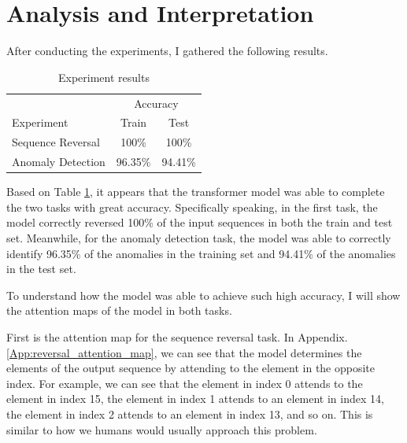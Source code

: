 \documentclass[peerreview]{IEEEtran}
\begin{document}
\section{Analysis and Interpretation}
After conducting the experiments, I gathered the following results. 


\begin{table}[h] 
\centering 
\begin{tabular}{l c c}
\toprule 
& \multicolumn{2}{c}{Accuracy} \\ 
\cmidrule(l){2-3} 
Experiment & Train & Test\\ 
\midrule
Sequence Reversal & 100\% & 100\%\\
Anomaly Detection & 96.35\% & 94.41\%\\ 
\bottomrule
\end{tabular}
\smallskip 
\caption{Experiment results} 
\label{tab:experiment results}
\end{table}

Based on Table \ref{tab:experiment results}, it appears that the transformer model was able to complete the two tasks with great accuracy. Specifically speaking, in the first task, the model correctly reversed 100\% of the input sequences in both the train and test set. Meanwhile, for the anomaly detection task, the model was able to correctly identify 96.35\% of the anomalies in the training set and  94.41\% of the anomalies in the test set.

To understand how the model was able to achieve such high accuracy, I will show the attention maps of the model in both tasks.

First is the attention map for the sequence reversal task. In Appendix. \ref{App:reversal_attention_map}, we can see that the model determines the elements of the output sequence by attending to the element in the opposite index. For example, we can see that the element in index 0 attends to the element in index 15, the element in index 1 attends to an element in index 14, the element in index 2 attends to an element in index 13, and so on. This is similar to how we humans would usually approach this problem.
\end{document}

